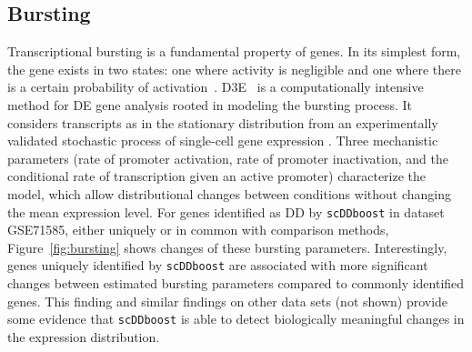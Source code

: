\documentclass[aoas,preprint]{imsart}
\begin{document}





\subsection{Bursting}


Transcriptional bursting is a fundamental property of genes. In its simplest form, the gene exists in two states: one where activity is negligible and one where there is a certain probability of 
activation~\citep{Raj:2008aa}. 
D3E~\citep{ref:d3e} is a computationally intensive 
method for DE gene analysis rooted in modeling the bursting process. It 
considers transcripts as in the stationary distribution from an 
experimentally validated stochastic process of single-cell gene expression \citep{Peccoud:1995aa}. 
Three mechanistic parameters (rate of promoter activation, rate of promoter inactivation, 
 and the conditional rate of transcription given an active  promoter) characterize the model, which allow
 distributional changes between conditions without changing the mean expression level.
For genes identified as DD by \verb+scDDboost+ in dataset GSE71585, either uniquely or in common with
comparison methods, Figure~\ref{fig:bursting} shows  changes of these bursting parameters. Interestingly, 
 genes uniquely identified by \verb+scDDboost+ are associated with more 
significant changes between estimated bursting parameters compared to commonly identified genes.
This finding and similar findings on other data sets (not shown) provide some evidence that \verb+scDDboost+
is able to detect biologically meaningful changes in the expression distribution.
\end{document}
